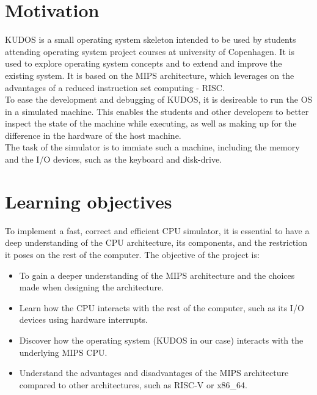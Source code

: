 \documentclass[11pt]{article}
\begin{document}
\section{Motivation}
KUDOS is a small operating system skeleton intended to be used by students
attending operating system project courses at university of Copenhagen.
It is used to explore operating system concepts and to extend and improve the
existing system.
It is based on the MIPS architecture, which leverages on the advantages of a
reduced instruction set computing - RISC.\\
To ease the development and debugging of KUDOS, it is desireable to run the OS
in a simulated machine. This enables the students and other developers to
better inspect the state of the machine while executing, as well as making up
for the difference in the hardware of the host machine.\\
The task of the simulator is to immiate such a machine, including the memory
and the I/O devices, such as the keyboard and disk-drive.


\section{Learning objectives}
To implement a fast, correct and efficient CPU simulator, it is essential
to have a deep understanding of the CPU architecture, its components, and
the restriction it poses on the rest of the computer.
The objective of the project is:
\begin{itemize}
\item To gain a deeper understanding of the MIPS architecture and the choices
made when
designing the architecture.
\item Learn how the CPU interacts with the rest of the computer, such as
its I/O devices using hardware interrupts.
\item Discover how the operating system (KUDOS in our case) interacts with the
underlying MIPS CPU.
\item Understand the advantages and disadvantages of the MIPS architecture
compared to other architectures, such as RISC-V or x86\_64.
\end{itemize}
\end{document}
